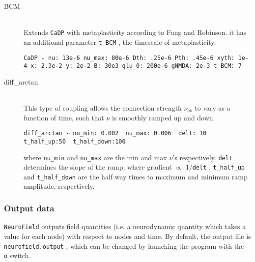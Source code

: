 \documentclass[12pt,a4paper]{article}
\newcommand{\type}[1]{{\small\small\tt #1} }
\newcommand{\NF}[0]{\type{NeuroField}}
\begin{document}
\begin{itemize}
\begin{description}
	\item[BCM]\ \\
	Extends \type{CaDP} with metaplasticity according to Fung and Robinson. it has an additional parameter \type{t\_BCM}, the timescale of metaplasticity.
	\begin{lstlisting}
CaDP - nu: 13e-6 nu_max: 80e-6 Dth: .25e-6 Pth: .45e-6 xyth: 1e-4 x: 2.3e-2 y: 2e-2 B: 30e3 glu_0: 200e-6 gNMDA: 2e-3 t_BCM: 7
	\end{lstlisting}
         \item[diff\_arctan]\ \\
	This type of coupling allows the connection strength $\nu_{ab}$ to vary as a function of time, such that $\nu$ is smoothly ramped up and down. 
	\begin{lstlisting}
diff_arctan - nu_min: 0.002  nu_max: 0.006  delt: 10  t_half_up:50  t_half_down:100
	\end{lstlisting}
where \type{nu\_min} and \type{nu\_max} are the min and max $\nu$'s respectively. \type{delt} determines the slope of the ramp, where gradient $\propto$ 1/\type{delt}. \type{t\_half\_up} and \type{t\_half\_down} are the half way times to maximum and minimum ramp amplitude, respectively.  
\end{description}
\end{itemize}

\subsubsection{Output data}
\label{sec:output}

\NF outputs field quantities (i.e. a neurodynamic quantity which takes a value for each node) with respect to nodes and time. By default, the output file is \type{neurofield.output}, which can be changed by launching the program with the \type{-o} switch.
\end{document}
